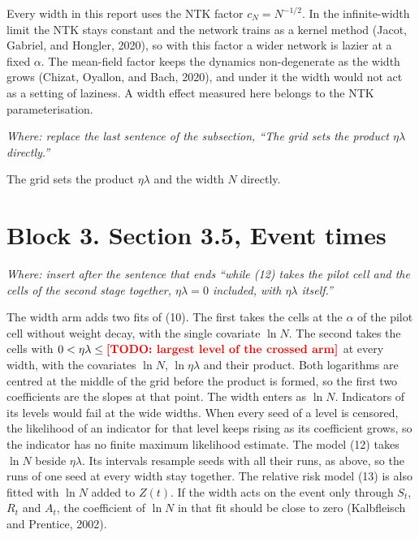 \documentclass[a4paper,11pt]{article} %
\newcommand{\citepas}[2]{(#2)}
\newcommand{\gref}[2]{#2}
\newcommand{\TODO}[1]{\textcolor{red}{\textbf{[TODO: #1]}}}
\newcommand{\where}[1]{\par\smallskip\noindent\textit{\small Where: #1}\par\smallskip}
\begin{document}
Every width in this report uses the NTK factor $c_N=N^{-1/2}$. In the
infinite-width limit the NTK stays constant and the network trains as a kernel
method \citepas{jacotNeuralTangentKernel2020}{Jacot, Gabriel, and Hongler,
2020}, so with this factor a wider network is lazier at a fixed $\alpha$. The
mean-field factor keeps the dynamics non-degenerate as the width grows
\citepas{chizatLazyTrainingDifferentiable2020}{Chizat, Oyallon, and Bach,
2020}, and under it the width would not act as a setting of laziness. A width
effect measured here belongs to the NTK parameterisation.

\where{replace the last sentence of the subsection, ``The grid sets the product
$\eta\lambda$ directly.''}

The grid sets the product $\eta\lambda$ and the width $N$ directly.

\section*{Block 3. Section 3.5, Event times}
\where{insert after the sentence that ends ``while (12) takes the pilot cell and
the cells of the second stage together, $\eta\lambda=0$ included, with
$\eta\lambda$ itself.''}

The width arm adds two fits of \gref{eq:aft}{(10)}. The first takes the cells
at the $\alpha$ of the pilot cell without weight decay, with the single
covariate $\ln N$. The second takes the cells with
$0<\eta\lambda\le\TODO{largest level of the crossed arm}$ at every width, with
the covariates $\ln N$, $\ln\eta\lambda$ and their product. Both logarithms are
centred at the middle of the grid before the product is formed, so the first
two coefficients are the slopes at that point. The width enters as $\ln N$.
Indicators of its levels would fail at the wide widths. When every seed of a
level is censored, the likelihood of an indicator for that level keeps rising
as its coefficient grows, so the indicator has no finite maximum likelihood
estimate. The model
\gref{eq:aalen}{(12)} takes $\ln N$ beside $\eta\lambda$. Its intervals
resample seeds with all their runs, as above, so the runs of one seed at every
width stay together. The relative risk model \gref{}{(13)} is also fitted with
$\ln N$ added to $Z(t)$. If the width acts on the event only through $S_t$,
$R_t$ and $A_t$, the coefficient of $\ln N$ in that fit should be close to zero
\citepas{kalbfleischStatisticalAnalysisFailure2002}{Kalbfleisch and Prentice,
2002}.
\end{document}
